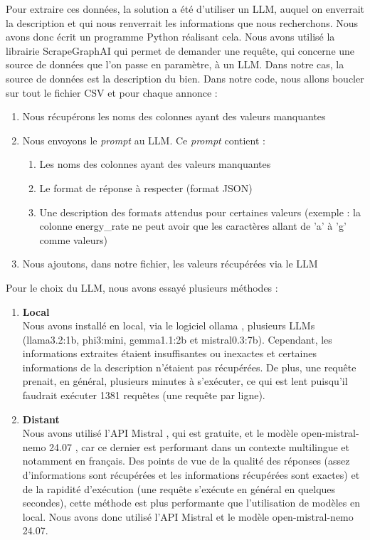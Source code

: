 \documentclass[a4paper, 12pt, twoside]{report}
\begin{document}
		Pour extraire ces données, la solution a été d'utiliser un LLM, auquel on enverrait la description et qui nous renverrait les informations que nous recherchons. Nous avons donc écrit un programme Python réalisant cela. Nous avons utilisé la librairie ScrapeGraphAI \cite{scrapegraphai} qui permet de demander une requête, qui concerne une source de données que l'on passe en paramètre, à un LLM. Dans notre cas, la source de données est la description du bien. Dans notre code, nous allons boucler sur tout le fichier CSV et pour chaque annonce : 
		\begin{enumerate}
			\item Nous récupérons les noms des colonnes ayant des valeurs manquantes
			\item Nous envoyons le {\it prompt} au LLM. Ce {\it prompt} contient :
				\begin{enumerate}
					\item Les noms des colonnes ayant des valeurs manquantes
					\item Le format de réponse à respecter (format JSON)
					\item Une description des formats attendus pour certaines valeurs (exemple : la colonne energy\_rate ne peut avoir que les caractères allant de 'a' à 'g' comme valeurs)
				\end{enumerate}
			\item Nous ajoutons, dans notre fichier, les valeurs récupérées via le LLM \\
		\end{enumerate}

		Pour le choix du LLM, nous avons essayé plusieurs méthodes :
		\begin{enumerate}
			\item {\bf Local} \\
			Nous avons installé en local, via le logiciel ollama \cite{ollama}, plusieurs LLMs (llama3.2:1b, phi3:mini, gemma1.1:2b et mistral0.3:7b). Cependant, les informations extraites étaient insuffisantes ou inexactes et certaines informations de la description n'étaient pas récupérées. De plus, une requête prenait, en général, plusieurs minutes à s'exécuter, ce qui est lent puisqu'il faudrait exécuter 1381 requêtes (une requête par ligne). 
			\item {\bf Distant} \\
			Nous avons utilisé l'API Mistral \cite{mistralai}, qui est gratuite, et le modèle open-mistral-nemo 24.07 \cite{mistralnemo}, car ce dernier est performant dans un contexte multilingue et notamment en français. Des points de vue de la qualité des réponses (assez d'informations sont récupérées et les informations récupérées sont exactes) et de la rapidité d'exécution (une requête s'exécute en général en quelques secondes), cette méthode est plus performante que l'utilisation de modèles en local. Nous avons donc utilisé l'API Mistral et le modèle open-mistral-nemo 24.07. \\
		\end{enumerate}
\end{document}
